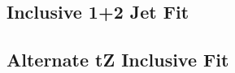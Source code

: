 

\subsection{Inclusive 1+2 Jet Fit}
\label{sec:incFit}


\subsection{Alternate tZ Inclusive Fit}
\label{sec:inc_tZ}

